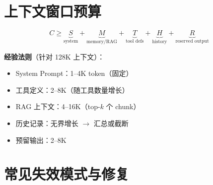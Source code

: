 \section{上下文窗口预算}
\label{context-window-budget}

\begin{equation}
C \geq \underbrace{S}_{\text{system}} + \underbrace{M}_{\text{memory/RAG}} + \underbrace{T}_{\text{tool defs}} + \underbrace{H}_{\text{history}} + \underbrace{R}_{\text{reserved output}}
\end{equation}

\textbf{经验法则}（针对 128K 上下文）：

\begin{itemize}
  \item System Prompt：1--4K token（固定）
  \item 工具定义：2--8K（随工具数量增长）
  \item RAG 上下文：4--16K（top-$k$ 个 chunk）
  \item 历史记录：无界增长 $\rightarrow$ 汇总或截断
  \item 预留输出：2--8K
\end{itemize}

\section{常见失效模式与修复}
\label{common-failure-modes-fixes}

